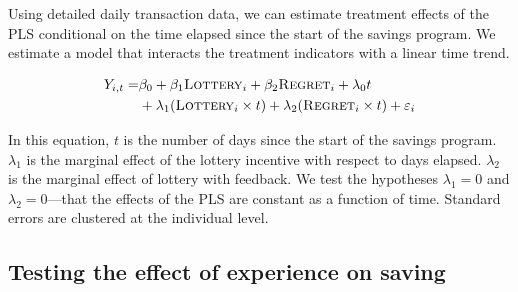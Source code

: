 \documentclass[11pt]{article}
\begin{document}
		Using detailed daily transaction data, we can estimate treatment effects of the PLS conditional on the time elapsed since the start of the savings program. We estimate a model that interacts the treatment indicators with a linear time trend.

		\begin{equation} \begin{split}
		Y_{i,t} = & \beta_{0} + \beta_{1}\text{\textsc{Lottery}}_{i} + \beta_{2}\text{\textsc{Regret}}_{i} + \lambda_{0}t \\
					& + \lambda_{1}(\text{\textsc{Lottery}}_{i} \times t) + \lambda_{2}(\text{\textsc{Regret}}_{i} \times t) + \varepsilon_{i}
		\end{split} \label{eq:timelinear} \end{equation}

		In this equation, $t$ is the number of days since the start of the savings program. $\lambda_1$ is the marginal effect of the lottery incentive with respect to days elapsed. $\lambda_2$ is the marginal effect of lottery with feedback. We test the hypotheses $\lambda_1 = 0$ and $\lambda_2 = 0$---that the effects of the PLS are constant as a function of time. Standard errors are clustered at the individual level.


	\subsection{Testing the effect of experience on saving}
\end{document}
